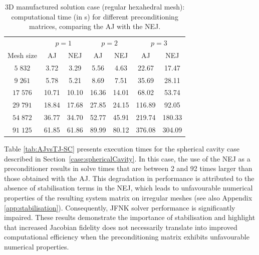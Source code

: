 \documentclass[sn-mathphys,Numbered]{sn-jnl}%
\begin{document}
\begin{table}[h]
\centering
\begin{tabular}{ccccccc}
\multicolumn{1}{l}{} & \multicolumn{2}{c}{$p=1$} & \multicolumn{2}{c}{$p=2$} & \multicolumn{2}{c}{$p=3$} \\
Mesh size             & AJ          & NEJ           & AJ          & NEJ           & AJ          & NEJ        \\ \hline
$5\;832$                  & 3.72           & 3.29            &  5.56          & 4.63          & 22.67         &  17.47        \\
$9\;261$                 & 5.78           & 5.21            &  8.69         & 7.51         & 35.69      &  28.11            \\
$17\;576$                  & 10.71          & 10.10            &  16.36          & 14.01       & 68.02         &  53.74           \\
$29\;791$                  & 18.84           & 17.68            &  27.85          & 24.15        & 116.89    &   92.05              \\
$54\;872$                 & 36.77           & 34.70            &  52.77          & 45.91         & 219.74  &   180.33                 \\
$91\;125$                 & 61.85          & 61.86          &  89.99        & 80.12       & 376.08 &  304.09              \\ \hline
\end{tabular}
\caption{3D manufactured solution case (regular hexahedral mesh): computational time (in s) for different preconditioning matrices, comparing the AJ with the NEJ.}
\label{tab:AJvsTJ-MMS}
\end{table}

Table \ref{tab:AJvsTJ-SC} presents execution times for the spherical cavity case described in Section~\ref{case:sphericalCavity}.
In this case, the use of the NEJ as a preconditioner results in solve times that are between 2 and 92 times larger than those obtained with the AJ.
This degradation in performance is attributed to the absence of stabilisation terms in the NEJ, which leads to unfavourable numerical properties of the resulting system matrix on irregular meshes (see also Appendix \ref{app:stabilisation}). Consequently, JFNK solver performance is significantly impaired. These results demonstrate the importance of stabilisation and highlight that increased Jacobian fidelity does not necessarily translate into improved computational efficiency when the preconditioning matrix exhibits unfavourable numerical properties.
\end{document}
